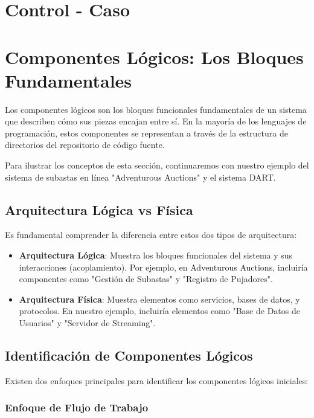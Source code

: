 \newpage
\section{Control - Caso}


\section{Componentes Lógicos: Los Bloques Fundamentales}

Los componentes lógicos son los bloques funcionales fundamentales de un sistema que describen cómo sus piezas encajan entre sí. En la mayoría de los lenguajes de programación, estos componentes se representan a través de la estructura de directorios del repositorio de código fuente.

Para ilustrar los conceptos de esta sección, continuaremos con nuestro ejemplo del sistema de subastas en línea "Adventurous Auctions" y el sistema DART.

\subsection{Arquitectura Lógica vs Física}

Es fundamental comprender la diferencia entre estos dos tipos de arquitectura:

\begin{itemize}
    \item \textbf{Arquitectura Lógica}: Muestra los bloques funcionales del sistema y sus interacciones (acoplamiento). Por ejemplo, en Adventurous Auctions, incluiría componentes como "Gestión de Subastas" y "Registro de Pujadores".
    \item \textbf{Arquitectura Física}: Muestra elementos como servicios, bases de datos, y protocolos. En nuestro ejemplo, incluiría elementos como "Base de Datos de Usuarios" y "Servidor de Streaming".
\end{itemize}

\subsection{Identificación de Componentes Lógicos}

Existen dos enfoques principales para identificar los componentes lógicos iniciales:

\subsubsection{Enfoque de Flujo de Trabajo}

